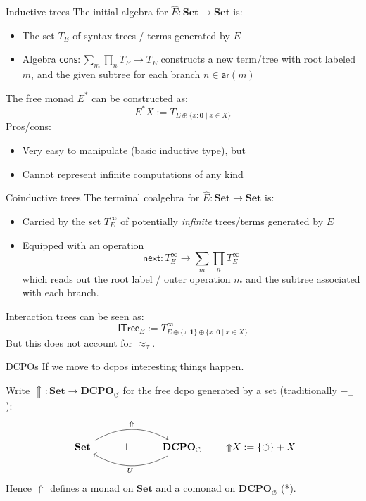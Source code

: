 \documentclass[aspectratio=1610,mathserif]{beamer}
\begin{document}
\begin{frame}{Inductive trees}
  The initial algebra for $\hat{E} : \mathbf{Set} \rightarrow \mathbf{Set}$
  is:
  \begin{itemize}
    \item The set $T_E$ of syntax trees / terms generated by $E$
    \item Algebra
        $\mathsf{cons} : \sum_m \prod_n T_E \rightarrow T_E$
      constructs a new term/tree with root labeled $m$,
      and the given subtree for each branch $n \in \mathsf{ar}(m)$
  \end{itemize}
  The free monad $E^*$ can be constructed as:
  \[
    E^* X := T_{E \oplus \{x : \mathbf{0} \mid x \in X\} }
  \]
  Pros/cons:
  \begin{itemize}
    \item Very easy to manipulate (basic inductive type), but
    \item Cannot represent infinite computations of any kind
  \end{itemize}
\end{frame}

\begin{frame}{Coinductive trees}
  The terminal coalgebra for
  $\hat{E} : \mathbf{Set} \rightarrow \mathbf{Set}$
  is:
  \begin{itemize}
    \item Carried by the set $T^\infty_E$
      of potentially \emph{infinite} trees/terms
      generated by $E$
    \item Equipped with an operation
      \[ \mathsf{next} : T^\infty_E \rightarrow \sum_m \prod_n T^\infty_E \]
      which reads out the root label / outer operation $m$
      and the subtree associated with each branch.
  \end{itemize}
  Interaction trees can be seen as:
  \[
    \mathsf{ITree}_E := T^\infty_{E \oplus \{\tau : \mathbf{1}\} 
      \oplus \{x : \mathbf{0} \mid x \in X\} }
  \]
  But this does not account for $\approx_\tau$.
\end{frame}

\begin{frame}[fragile]{DCPOs}
  If we move to dcpos interesting things happen.

  \vspace{1em}
  Write $\Uparrow : \mathbf{Set} \rightarrow \mathbf{DCPO}_\circlearrowleft$
  for the free dcpo generated by a set (traditionally ${-}_\bot$):
  \[
    \begin{tikzcd}
      \mathbf{Set} \ar[rr, bend left, "\Uparrow"] & \bot &
      \mathbf{DCPO}_\circlearrowleft \ar[ll, bend left, "U"]
    \end{tikzcd}
    \qquad
    {\Uparrow}X := \{ \circlearrowleft \} + X
  \]
  Hence $\Uparrow$ defines a monad on $\mathbf{Set}$ and
  a comonad on $\mathbf{DCPO}_\circlearrowleft$ (*).
\end{frame}
\end{document}
